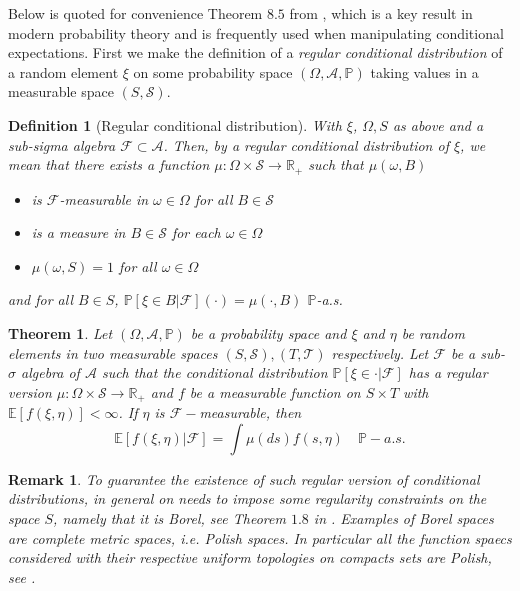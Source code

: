 \documentclass[12pt]{report}
\theoremstyle{plain}
\newtheorem{theorem}{Theorem}[section]
\newtheorem*{remark}{Remark}
\newtheorem{definition}{Definition}[section]
\newcommand{\R}{\ensuremath{\mathbb{R}}}
\begin{document}
Below is quoted for convenience Theorem $8.5$ from \cite{kallenberg1997foundations}, which is a key result in modern probability theory and is frequently used when manipulating conditional expectations. First we make the definition of a \textit{regular conditional distribution} of a random element $\xi$ on some probability space $(\Omega, \mathcal{A}, \mathbb{P})$ taking values in a measurable space $(S,\mathcal{S})$.\\

\begin{definition}[Regular conditional distribution]
    With $\xi$, $\Omega, S$ as above and a sub-sigma algebra $\mathcal{F}\subset\mathcal{A}$. Then, by a \textit{regular conditional distribution} of $\xi$, we mean that there exists a function $\mu:\Omega\times\mathcal{S}\to \R_{+}$ such that $\mu(\omega,B)$
    \begin{itemize}
        \item is $\mathcal{F}$-measurable in $\omega\in \Omega$ for all $B\in\mathcal{S}$
        \item is a measure in $B\in\mathcal{S}$ for each $\omega\in \Omega$
        \item $\mu(\omega,S)=1$ for all $\omega\in \Omega$
    \end{itemize}
    and for all $B\in S$, $\mathbb{P}[\xi\in B|\mathcal{F}](\cdot)=\mu(\cdot, B)$ $\mathbb{P}$-a.s.
\end{definition}

\begin{theorem}\label{thm: Disintegration}
    Let $(\Omega, \mathcal{A}, \mathbb{P})$ be a probability space and $\xi$ and $\eta$ be random elements in two measurable spaces $(S,\mathcal{S}),(T, \mathcal{T})$ respectively. Let $\mathcal{F}$ be a sub-$\sigma$ algebra of $\mathcal{A}$ such that the conditional distribution $\mathbb{P}[\xi\in \cdot|\mathcal{F}]$ has a regular version $\mu:\Omega\times\mathcal{S}\to \R_{+}$ and $f$ be a measurable function on $S\times T$ with $\mathbb{E}[f(\xi, \eta)]<\infty$. If $\eta$ is $\mathcal{F}-$measurable, then 
    \[\mathbb{E}[f(\xi,\eta)|\mathcal{F}] = \displaystyle \int \mu(ds)f(s,\eta)\quad \mathbb{P}-a.s. \]
\end{theorem}

\begin{remark}
    To guarantee the existence of such regular version of conditional distributions, in general on needs to impose some regularity constraints on the space $S$, namely that it is Borel, see Theorem $1.8$ in \cite{kallenberg1997foundations}. Examples of Borel spaces are complete metric spaces, i.e. \textit{Polish} spaces. In particular all the function spaecs considered with their respective uniform topologies on compacts sets are Polish, see \cite{kallenberg1997foundations}.
\end{remark}
\end{document}
